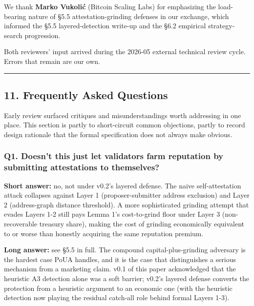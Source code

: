 \documentclass[
  11pt,
]{article}
\begin{document}
We thank \textbf{Marko Vukolić} (Bitcoin Scaling Labs) for emphasizing
the load-bearing nature of §5.5 attestation-grinding defenses in our
exchange, which informed the §5.5 layered-detection write-up and the
§6.2 empirical strategy-search progression.

Both reviewers' input arrived during the 2026-05 external technical
review cycle. Errors that remain are our own.

\begin{center}\rule{0.5\linewidth}{0.5pt}\end{center}

\newpage

\subsection{11. Frequently Asked
Questions}\label{frequently-asked-questions}

Early review surfaced critiques and misunderstandings worth addressing
in one place. This section is partly to short-circuit common objections,
partly to record design rationale that the formal specification does not
always make obvious.

\subsubsection{Q1. Doesn't this just let validators farm reputation by
submitting attestations to
themselves?}\label{q1.-doesnt-this-just-let-validators-farm-reputation-by-submitting-attestations-to-themselves}

\textbf{Short answer:} no, not under v0.2's layered defense. The naive
self-attestation attack collapses against Layer 1 (proposer-submitter
address exclusion) and Layer 2 (address-graph distance threshold). A
more sophisticated grinding attempt that evades Layers 1-2 still pays
Lemma 1's cost-to-grind floor under Layer 3 (non-recoverable treasury
share), making the cost of grinding economically equivalent to or worse
than honestly acquiring the same reputation premium.

\textbf{Long answer:} see §5.5 in full. The compound
capital-plus-grinding adversary is the hardest case PoUA handles, and it
is the case that distinguishes a serious mechanism from a marketing
claim. v0.1 of this paper acknowledged that the heuristic A3 detection
alone was a soft barrier; v0.2's layered defense converts the protection
from a heuristic argument to an economic one (with the heuristic
detection now playing the residual catch-all role behind formal Layers
1-3).
\end{document}
